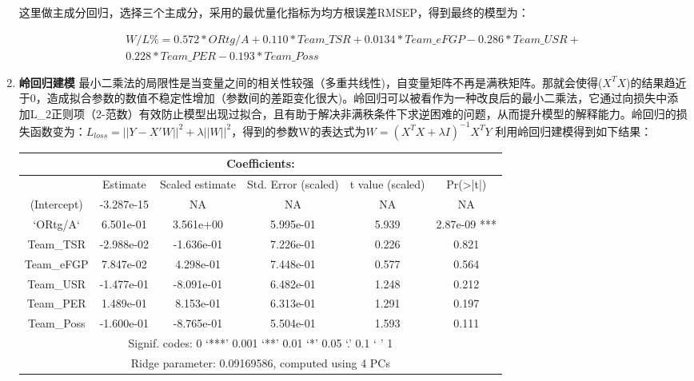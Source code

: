 \begin{enumerate}
这里做主成分回归，选择三个主成分，采用的最优量化指标为均方根误差RMSEP，得到最终的模型为：

\begin{multline}
  W/L\% = 0.572*ORtg/A+0.110*Team\_TSR+0.0134*Team\_eFGP-0.286*Team\_USR+\\0.228*Team\_PER-0.193*Team\_Poss
\end{multline}




\item {\bfseries 岭回归建模}
最小二乘法的局限性是当变量之间的相关性较强（多重共线性)，自变量矩阵不再是满秩矩阵。那就会使得($X^{T}X$)的结果趋近于0，造成拟合参数的数值不稳定性增加（参数间的差距变化很大)。岭回归可以被看作为一种改良后的最小二乘法，它通过向损失中添加L\_{2}正则项（2-范数）有效防止模型出现过拟合，且有助于解决非满秩条件下求逆困难的问题，从而提升模型的解释能力。岭回归的损失函数变为：$L_{loss}=||Y-X'W||^2+\lambda ||W||^2$，得到的参数W的表达式为$W=(X^TX+\lambda I)^{-1}X^TY$
利用岭回归建模得到如下结果：
\begin{table}[h]
	\begin{tabular}{|c|c|c|c|c|c|}
		\hline
		\multicolumn{6}{|c|}{Coefficients:}\\
		\hline
		& Estimate &Scaled estimate& Std. Error (scaled)& t value (scaled) &Pr(>|t|)   \\
		  (Intercept)& -3.287e-15  &            NA   &               NA      &         NA  &     NA  \\
		    `ORtg/A`   &  6.501e-01  &     3.561e+00       &    5.995e-01      &      5.939 &2.87e-09 ***\\
		    Team\_TSR &   -2.988e-02&      -1.636e-01  &         7.226e-01    &        0.226  &  0.821    \\
		    Team\_eFGP &   7.847e-02  &     4.298e-01  &         7.448e-01     &       0.577   & 0.564   \\ 
		    Team\_USR &   -1.477e-01 &     -8.091e-01     &      6.482e-01   &         1.248  &  0.212  \\  
		    Team\_PER   &  1.489e-01&       8.153e-01       &    6.313e-01     &       1.291   & 0.197   \\ 
		    Team\_Poss   &-1.600e-01 &     -8.765e-01   &        5.504e-01   &         1.593 &   0.111   \\ 
		    \hline
		    \multicolumn{6}{|c|}{Signif. codes:  0 ‘***’ 0.001 ‘**’ 0.01 ‘*’ 0.05 ‘.’ 0.1 ‘ ’ 1}\\
		    \hline
		     \multicolumn{6}{|c|}{Ridge parameter: 0.09169586, computed using 4 PCs}\\

\end{tabular}
\end{table}
\end{enumerate}
